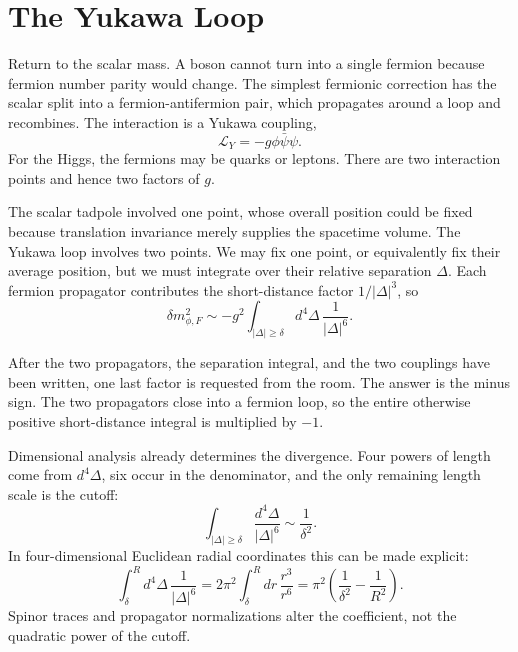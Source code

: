 \section{The Yukawa Loop}

Return to the scalar mass. A boson cannot turn into a single fermion because fermion number parity would change. The simplest fermionic correction has the scalar split into a fermion-antifermion pair, which propagates around a loop and recombines. The interaction is a Yukawa coupling,
\begin{equation}
\mathcal L_Y=-g\phi\bar\psi\psi.
\end{equation}
For the Higgs, the fermions may be quarks or leptons. There are two interaction points and hence two factors of \(g\).

The scalar tadpole involved one point, whose overall position could be fixed because translation invariance merely supplies the spacetime volume. The Yukawa loop involves two points. We may fix one point, or equivalently fix their average position, but we must integrate over their relative separation \(\Delta\). Each fermion propagator contributes the short-distance factor \(1/|\Delta|^3\), so
\begin{equation}
\delta m_{\phi,F}^2
\sim
-g^2\int_{|\Delta|\geq\delta}d^4\Delta\,
\frac{1}{|\Delta|^6}.
\end{equation}

After the two propagators, the separation integral, and the two couplings have been written, one last factor is requested from the room. The answer is the minus sign. The two propagators close into a fermion loop, so the entire otherwise positive short-distance integral is multiplied by \(-1\).

Dimensional analysis already determines the divergence. Four powers of length come from \(d^4\Delta\), six occur in the denominator, and the only remaining length scale is the cutoff:
\begin{equation}
\int_{|\Delta|\geq\delta}
\frac{d^4\Delta}{|\Delta|^6}
\sim\frac{1}{\delta^2}.
\end{equation}
In four-dimensional Euclidean radial coordinates this can be made explicit:
\begin{equation}
\int_{\delta}^{R}d^4\Delta\,\frac{1}{|\Delta|^6}
=2\pi^2\int_{\delta}^{R}dr\,\frac{r^3}{r^6}
=\pi^2\left(\frac{1}{\delta^2}-\frac{1}{R^2}\right).
\end{equation}
Spinor traces and propagator normalizations alter the coefficient, not the quadratic power of the cutoff.

